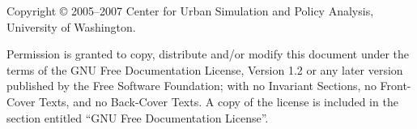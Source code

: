 

Copyright \copyright{} 2005--2007
Center for Urban Simulation and Policy Analysis,
University of Washington.  

Permission is granted to copy, distribute and/or
modify this document under the terms of the GNU Free Documentation License,
Version 1.2 or any later version published by the Free Software Foundation;
with no Invariant Sections, no Front-Cover Texts, and no Back-Cover Texts.
A copy of the license is included in the section entitled ``GNU Free
Documentation License''.

